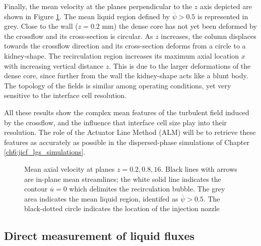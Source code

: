 Finally, the mean velocity at the planes perpendicular to the $z$ axis depicted are shown in Figure \ref{fig:JICF_turbulent_structures_planes_z}.  The mean liquid region defined by $\overline{\psi} > 0.5$ is represented in grey. Close to the wall ($z = 0.2$ mm) the dense core has not yet been deformed by the crossflow and its cross-section is circular. As $z$ increases, the column displaces towards the crossflow direction and its cross-section deforms from a circle to a kidney-shape. The recirculation region increases its maximum axial location $x$ with increasing vertical distance $z$. This is due to the larger deformations of the dense core, since further from the wall the kidney-shape acts like a blunt body. The topology of the fields is similar among operating conditions, yet very sensitive to the interface cell resolution. 

All these results show the complex mean features of the turbulent field induced by the crossflow, and the influence that  interface cell size play into their resolution. The role of the Actuator Line Method (ALM) will be to retrieve these features as accurately as possible in the dispersed-phase simulations of Chapter \ref{ch6:jicf_lgs_simulations}.




\clearpage



\begin{figure}[ht]
\centering
\caption[Mean axial velocity at planes $z = 0.2, 0.8, 16$ mm]{Mean axial velocity at planes $z = 0.2, 0.8, 16$. Black lines with arrows are in-plane mean streamlines; the white solid line indicates the contour $\overline{u} = 0$ which delimites the recirculation bubble. The grey area  indicates the mean liquid region, identifed as $\overline{\psi} > 0.5$. The black-dotted circle indicates the location of the injection nozzle}
\label{fig:JICF_turbulent_structures_planes_z}
\end{figure}




\subsection{Direct measurement of liquid fluxes}
\label{subsec:ch5_direct_measurement_fluxes_IB}

